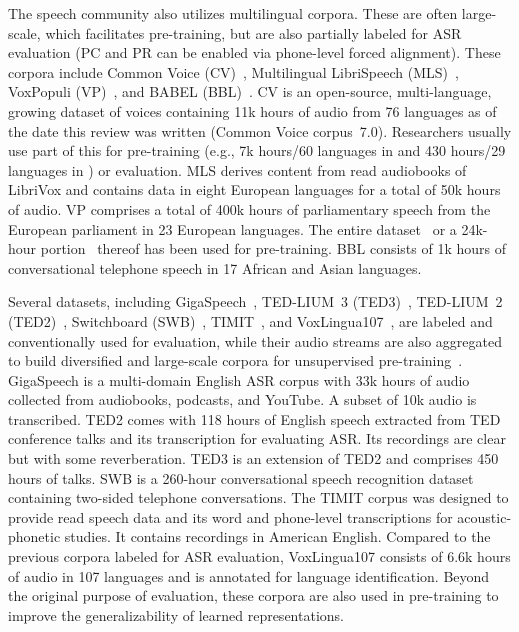 The speech community also utilizes multilingual corpora. These are often
large-scale, which facilitates pre-training, but are also partially labeled for ASR
evaluation (PC and PR can be enabled via phone-level forced alignment). These
corpora include Common Voice (CV)~\parencite{ardila_common_2020}, Multilingual
LibriSpeech (MLS)~\parencite{pratap_mls_2020}, VoxPopuli 
(VP)~\parencite{wang_voxpopuli_2021}, and BABEL (BBL)~\parencite{gales_speech_2014}. CV is
an open-source, multi-language, growing dataset of voices containing 11k hours
of audio from 76 languages as of the date this review was written (Common Voice
corpus~7.0). Researchers usually use part of this for pre-training (e.g., 7k
hours/60 languages in \parencite{babu_xlsr_2021} and 430 hours/29 languages in
\parencite{kawakami_learning_2020}) or evaluation. 
MLS derives content from read audiobooks of LibriVox and contains data in eight
European languages for a total of 50k hours of audio. VP comprises a total of 400k
hours of parliamentary speech from the European parliament in 23 European
languages.
The entire dataset~\parencite{babu_xlsr_2021} or a 24k-hour 
portion~\parencite{chen_unispeechsat_2021, chen_wavlm_2021} thereof has been used for pre-training. BBL
consists of 1k hours of conversational telephone speech in 17 African and Asian
languages.

Several datasets, including GigaSpeech~\parencite{chen_gigaspeech_2021}, TED-LIUM~3
(TED3)~\parencite{hernandez_tedlium_2018}, TED-LIUM~2 (TED2)~\parencite{rousseau_tedlium_2012},
Switchboard (SWB)~\parencite{godfrey_switchboard_1992}, 
TIMIT~\parencite{garofolo_timit_1993}, and VoxLingua107~\parencite{valk_voxlingua107_2021}, are
labeled and conventionally used for evaluation, while their audio streams are
also aggregated to build diversified and large-scale corpora for unsupervised
pre-training~\parencite{kawakami_learning_2020, song_speechxlnet_2020, babu_xlsr_2021}.
GigaSpeech is a multi-domain English ASR corpus with 33k hours of audio
collected from audiobooks, podcasts, and YouTube. A subset of 10k audio is
transcribed. TED2 comes with 118 hours of English speech extracted from
TED conference talks and its transcription for evaluating ASR. Its recordings
are clear but with some reverberation. TED3 is an extension of TED2 and
comprises 450 hours of talks. SWB is a 260-hour conversational speech
recognition dataset containing two-sided telephone conversations.
The TIMIT corpus was designed to provide read speech data and its word and
phone-level transcriptions for acoustic-phonetic studies. It contains recordings
in American English. Compared to the previous corpora labeled for ASR
evaluation, VoxLingua107 consists of 6.6k hours of audio in 107 languages and
is annotated for language identification. Beyond the original purpose of
evaluation, these corpora are also used in pre-training to improve the
generalizability of learned representations.

